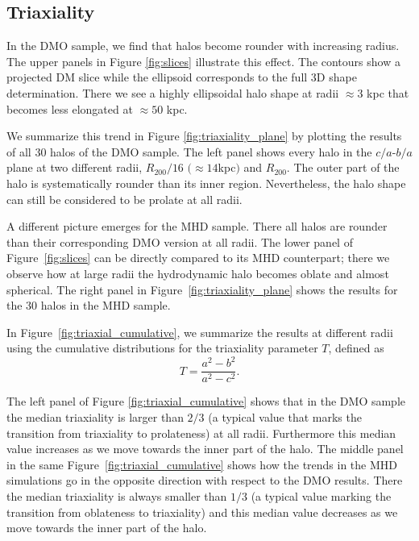 \documentclass[usenatbib]{mnras}
\begin{document}
\subsection{Triaxiality}


In the DMO sample, we find that halos become rounder with increasing radius.
The upper panels in Figure \ref{fig:slices} illustrate this effect.
The contours show a projected DM slice while the ellipsoid corresponds
to the full 3D shape determination. There we see a highly ellipsoidal
halo shape at radii $\approx 3$ kpc that becomes less elongated at
$\approx 50$ kpc. 

We summarize this trend in Figure \ref{fig:triaxiality_plane} by
plotting the results of all 30 halos of the DMO sample.
The left panel shows every halo in the $c/a$-$b/a$ plane at
two different radii, $R_{200}/16$ $(\approx 14$kpc$)$ and $R_{200}$. 
The outer part of the halo is systematically rounder than its inner
region. Nevertheless, the halo shape can still be considered to be prolate at
all radii. 

A different picture emerges for the MHD sample.
There all halos are rounder than their corresponding DMO
version at all radii. The lower panel of Figure~\ref{fig:slices} can be directly compared to
its MHD counterpart; there we observe how at large radii the hydrodynamic halo
becomes oblate and almost spherical. The right panel in Figure~\ref{fig:triaxiality_plane} shows the
results for the 30 halos in the MHD sample.

In Figure~\ref{fig:triaxial_cumulative}, we summarize the results at
different radii using the cumulative distributions for the 
triaxiality parameter $T$, defined as 
\begin{equation}
T=\frac{a^2-b^2}{a^2-c^2}.
\label{eq:triaxiality}
\end{equation}

The left panel of Figure \ref{fig:triaxial_cumulative} shows that in
the DMO sample the median triaxiality is larger than $2/3$ (a
typical value that marks the transition from triaxiality to
prolateness) at all radii. Furthermore this median value increases 
as we move towards the inner part of the halo.
The middle panel in the same Figure~\ref{fig:triaxial_cumulative}
shows how the trends in the MHD simulations go 
in the opposite direction with respect to the DMO results.
There the median triaxiality is always smaller than $1/3$ (a typical
value marking the transition from oblateness to triaxiality) and this
median value decreases as we move towards the inner part of the halo.
\end{document}
